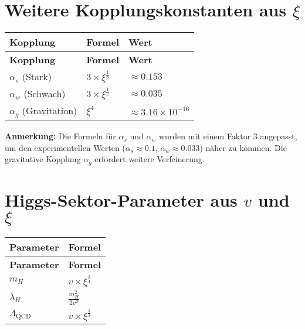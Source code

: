 \documentclass[12pt,a4paper]{article}
\begin{document}
	\section{Weitere Kopplungskonstanten aus $\xi$}
	\begin{longtable}{|p{4cm}|p{4cm}|p{4cm}|}
		\hline
		\textbf{Kopplung} & \textbf{Formel} & \textbf{Wert} \\
		\hline
		\endfirsthead
		\hline
		\textbf{Kopplung} & \textbf{Formel} & \textbf{Wert} \\
		\hline
		\endhead
		$\alpha_s$ (Stark) & $3 \times \xi^{\frac{1}{3}}$ & $\approx 0.153$ \\
		\hline
		$\alpha_w$ (Schwach) & $3 \times \xi^{\frac{1}{2}}$ & $\approx 0.035$ \\
		\hline
		$\alpha_g$ (Gravitation) & $\xi^4$ & $\approx 3.16 \times 10^{-16}$ \\
		\hline
	\end{longtable}
	
	\textbf{Anmerkung:} Die Formeln für $\alpha_s$ und $\alpha_w$ wurden mit einem Faktor 3 angepasst, um den experimentellen Werten ($\alpha_s \approx 0.1$, $\alpha_w \approx 0.033$) näher zu kommen. Die gravitative Kopplung $\alpha_g$ erfordert weitere Verfeinerung.
	
	\section{Higgs-Sektor-Parameter aus $v$ und $\xi$}
	\begin{longtable}{|p{5cm}|p{6cm}|}
		\hline
		\textbf{Parameter} & \textbf{Formel} \\
		\hline
		\endfirsthead
		\hline
		\textbf{Parameter} & \textbf{Formel} \\
		\hline
		\endhead
		$m_H$ & $v \times \xi^{\frac{1}{4}}$ \\
		\hline
		$\lambda_H$ & $\frac{m_H^{2}}{2v^{2}}$ \\
		\hline
		$\Lambda_{\text{QCD}}$ & $v \times \xi^{\frac{1}{3}}$ \\
		\hline
	\end{longtable}
	
\end{document}
